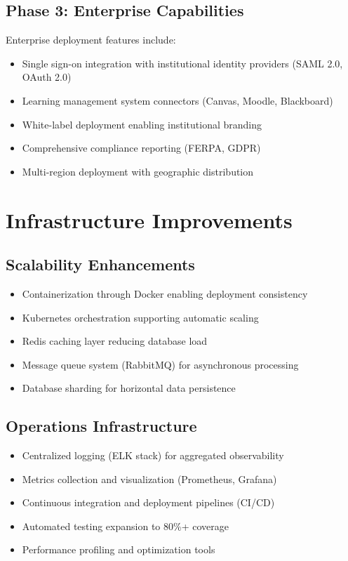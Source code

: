 \documentclass[12pt,a4paper]{report}
\begin{document}
\subsection{Phase 3: Enterprise Capabilities}

Enterprise deployment features include:

\begin{itemize}[left=0pt]
  \item Single sign-on integration with institutional identity providers (SAML 2.0, OAuth 2.0)
  \item Learning management system connectors (Canvas, Moodle, Blackboard)
  \item White-label deployment enabling institutional branding
  \item Comprehensive compliance reporting (FERPA, GDPR)
  \item Multi-region deployment with geographic distribution
\end{itemize}

\section{Infrastructure Improvements}

\subsection{Scalability Enhancements}

\begin{itemize}[left=0pt]
  \item Containerization through Docker enabling deployment consistency
  \item Kubernetes orchestration supporting automatic scaling
  \item Redis caching layer reducing database load
  \item Message queue system (RabbitMQ) for asynchronous processing
  \item Database sharding for horizontal data persistence
\end{itemize}

\subsection{Operations Infrastructure}

\begin{itemize}[left=0pt]
  \item Centralized logging (ELK stack) for aggregated observability
  \item Metrics collection and visualization (Prometheus, Grafana)
  \item Continuous integration and deployment pipelines (CI/CD)
  \item Automated testing expansion to 80\%+ coverage
  \item Performance profiling and optimization tools
\end{itemize}
\end{document}
